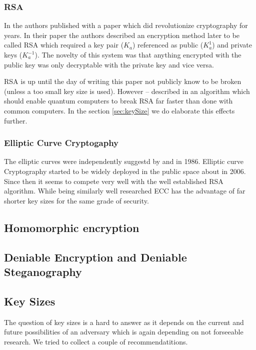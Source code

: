 \subsubsection{RSA}
In \citeyear{Rivest:1978:MOD:359340.359342} the authors \citeauthor{Rivest:1978:MOD:359340.359342} published with \cite{Rivest:1978:MOD:359340.359342} a paper which did revolutionize cryptography for years. In their paper the authors described an encryption method later to be called RSA which required a key pair ($K_a$) referenced as public ($K^{1}_a$) and private keys ($K^{-1}_a$). The novelty of this system was that anything encrypted with the public key was only decryptable with the private key and vice versa.

RSA is up until the day of writing this paper not publicly know to be broken (unless a too small key size is used). However -- \citeauthor{Shor97polynomial-timealgorithms} described in \citeyear{Shor97polynomial-timealgorithms} an algorithm which should enable quantum computers to break RSA far faster than done with common computers. In the section \ref{sec:keySize} we do elaborate this effects further.

\subsubsection{Elliptic Curve Cryptogaphy}
The elliptic curves were independently suggestd by \cite{Miller1986} and \cite{Koblitz04guideto} in 1986. Elliptic curve Cryptography started to be widely deployed in the public space about in 2006. Since then it seems to compete very well with the well established RSA algorithm. While being similarly well researched ECC has the advantage of far shorter key sizes for the same grade of security.

\subsection{Homomorphic encryption}
\cite{Gentry:2009:FHE:1536414.1536440}

\subsection{Deniable Encryption and Deniable Steganography}

\subsection{Key Sizes\label{sec:keySize}}
The question of key sizes is a hard to answer as it depends on the current and future possibilities of an adversary which is again depending on not forseeable research. We tried to collect a couple of recommendatitions.

